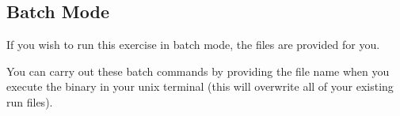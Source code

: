 %
%





\bigskip
\subsection*{Batch Mode}

If you wish to run this exercise in batch mode, the files are provided for you. 

You can carry out these batch commands by providing the file name when you execute the  binary in your unix terminal (this will overwrite all of your existing run files).

